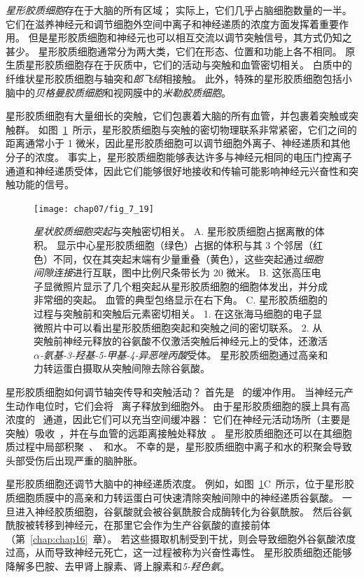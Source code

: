 \textit{星形胶质细胞}存在于大脑的所有区域；
实际上，它们几乎占脑细胞数量的一半。
它们在滋养神经元和调节细胞外空间中离子和神经递质的浓度方面发挥着重要作用。
但是星形胶质细胞和神经元也可以相互交流以调节突触信号，其方式仍知之甚少。
星形胶质细胞通常分为两大类，它们在形态、位置和功能上各不相同。
原生质星形胶质细胞存在于灰质中，它们的活动与突触和血管密切相关。
白质中的纤维状星形胶质细胞与轴突和\textit{郎飞结}相接触。
此外，特殊的星形胶质细胞包括小脑中的\textit{贝格曼胶质细胞}和视网膜中的\textit{米勒胶质细胞}。


星形胶质细胞有大量细长的突触，它们包裹着大脑的所有血管，并包裹着突触或突触群。
如图~\ref{fig:7_19}~所示，星形胶质细胞与突触的密切物理联系非常紧密，它们之间的距离通常小于 1 微米，因此星形胶质细胞可以调节细胞外离子、神经递质和其他分子的浓度。
事实上，星形胶质细胞能够表达许多与神经元相同的电压门控离子通道和神经递质受体，因此它们能够很好地接收和传输可能影响神经元兴奋性和突触功能的信号。


\begin{figure}[htbp]
	\centering
	\texttt{[image: chap07/fig\_7\_19]}
	\caption{\textit{星状胶质细胞突起}与突触密切相关。
		A. 星形胶质细胞占据离散的体积。
		显示中心星形胶质细胞（绿色）占据的体积与其 3 个邻居（红色）不同，仅在其突起末端有少量重叠（黄色），这些突起通过\textit{细胞间隙连接}进行互联，图中比例尺条带长为 20 微米\cite{bushong2002protoplasmic}。
		B. 这张高压电子显微照片显示了几个粗突起从星形胶质细胞的细胞体发出，并分成非常细的突起。
		血管的典型包络显示在右下角\cite{hama1994three}。
		C. 星形胶质细胞的过程与突触前和突触后元素密切相关。
		1. 在这张海马细胞的电子显微照片中可以看出星形胶质细胞突起和突触之间的密切联系\cite{ventura1999three}。
		2. 从突触前神经元释放的谷氨酸不仅激活突触后神经元上的受体，还激活\textit{$\alpha$-氨基-3-羟基-5-甲基-4-异恶唑丙酸}受体。
		星形胶质细胞通过高亲和力转运蛋白摄取从突触间隙去除谷氨酸\cite{gallo2001unwrapping}。}
	\label{fig:7_19}
\end{figure}


星形胶质细胞如何调节轴突传导和突触活动？
首先是~ 的缓冲作用。
当神经元产生动作电位时，它们会将~ 离子释放到细胞外。
由于星形胶质细胞的膜上具有高浓度的~ 通道，因此它们可以充当空间缓冲器：
它们在神经元活动场所（主要是突触）吸收~，并在与血管的远距离接触处释放~。
星形胶质细胞还可以在其细胞质过程中局部积聚~、~和水。
不幸的是，星形胶质细胞中离子和水的积聚会导致头部受伤后出现严重的脑肿胀。


星形胶质细胞还调节大脑中的神经递质浓度。
例如，如图~\ref{fig:7_19}C~所示，位于星形胶质细胞质膜中的高亲和力转运蛋白可快速清除突触间隙中的神经递质谷氨酸。
一旦进入神经胶质细胞，谷氨酸就会被谷氨酰胺合成酶转化为谷氨酰胺。
然后谷氨酰胺被转移到神经元，在那里它会作为生产谷氨酸的直接前体（第~\ref{chap:chap16}~章）。
若这些摄取机制受到干扰，则会导致细胞外谷氨酸浓度过高，从而导致神经元死亡，这一过程被称为兴奋性毒性。
星形胶质细胞还能够降解多巴胺、去甲肾上腺素、肾上腺素和\textit{5-羟色氨}。


